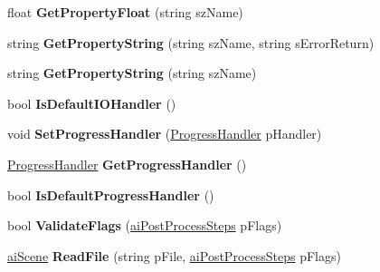 \begin{DoxyCompactItemize}
\item 
\hypertarget{class_importer_a4dbb2f53e1a4736dfcc8692b8f653af1}{float {\bfseries Get\+Property\+Float} (string sz\+Name)}\label{class_importer_a4dbb2f53e1a4736dfcc8692b8f653af1}

\item 
\hypertarget{class_importer_a094990789945fad014a1f2892eb691a6}{string {\bfseries Get\+Property\+String} (string sz\+Name, string s\+Error\+Return)}\label{class_importer_a094990789945fad014a1f2892eb691a6}

\item 
\hypertarget{class_importer_ace61865cff6507e6de9afe5d3362f546}{string {\bfseries Get\+Property\+String} (string sz\+Name)}\label{class_importer_ace61865cff6507e6de9afe5d3362f546}

\item 
\hypertarget{class_importer_a720e30d38e28fa9963eeaf656c310ae9}{bool {\bfseries Is\+Default\+I\+O\+Handler} ()}\label{class_importer_a720e30d38e28fa9963eeaf656c310ae9}

\item 
\hypertarget{class_importer_aa71056a6024b13fb3631c48923c42032}{void {\bfseries Set\+Progress\+Handler} (\hyperlink{class_progress_handler}{Progress\+Handler} p\+Handler)}\label{class_importer_aa71056a6024b13fb3631c48923c42032}

\item 
\hypertarget{class_importer_adc8a7ba4d49aaaae298c6b90ba1e7ad0}{\hyperlink{class_progress_handler}{Progress\+Handler} {\bfseries Get\+Progress\+Handler} ()}\label{class_importer_adc8a7ba4d49aaaae298c6b90ba1e7ad0}

\item 
\hypertarget{class_importer_a21723a4125a689b4ec94fa0cac9eb3f8}{bool {\bfseries Is\+Default\+Progress\+Handler} ()}\label{class_importer_a21723a4125a689b4ec94fa0cac9eb3f8}

\item 
\hypertarget{class_importer_a5d9ef917bec903e3f8fa6245fc2191ff}{bool {\bfseries Validate\+Flags} (\hyperlink{postprocess_8h_a64795260b95f5a4b3f3dc1be4f52e410}{ai\+Post\+Process\+Steps} p\+Flags)}\label{class_importer_a5d9ef917bec903e3f8fa6245fc2191ff}

\item 
\hypertarget{class_importer_abf6e43cd64dd0bfb02263b08a1daf784}{\hyperlink{structai_scene}{ai\+Scene} {\bfseries Read\+File} (string p\+File, \hyperlink{postprocess_8h_a64795260b95f5a4b3f3dc1be4f52e410}{ai\+Post\+Process\+Steps} p\+Flags)}\label{class_importer_abf6e43cd64dd0bfb02263b08a1daf784}


\end{DoxyCompactItemize}
